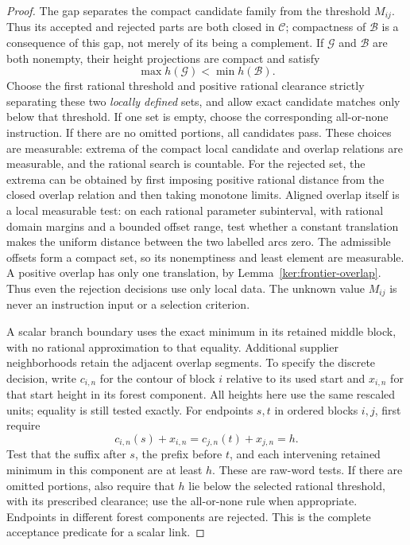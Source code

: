 \documentclass[11pt]{article}
\numberwithin{equation}{section}
\theoremstyle{definition}
\theoremstyle{remark}
\newcommand{\1}{\mathbf 1}
\begin{document}
\begin{proof}
The gap separates the compact candidate family from the threshold
\(M_{ij}\).  Thus its accepted and rejected parts are both closed
in \(\mathcal C\); compactness of \(\mathcal B\) is a consequence
of this gap, not merely of its being a complement.  If
\(\mathcal G\) and \(\mathcal B\) are both nonempty, their height
projections are compact and satisfy
\[
 \max h(\mathcal G)<\min h(\mathcal B).
\]
Choose the first rational threshold and positive rational clearance
strictly separating these two \emph{locally defined} sets, and allow
exact candidate matches only below that threshold.  If one set is
empty, choose the corresponding all-or-none instruction.  If there
are no omitted portions, all candidates pass.  These choices are
measurable: extrema of the compact local candidate and overlap
relations are measurable, and the rational search is countable.
For the rejected set, the extrema can be obtained by first imposing
positive rational distance from the closed overlap relation and then
taking monotone limits.  Aligned overlap itself is a local measurable
test: on each rational parameter subinterval, with rational domain
margins and a bounded offset range, test whether a constant translation
makes the uniform distance between the two labelled arcs zero.
The admissible offsets form a compact set, so its nonemptiness and
least element are measurable.  A positive overlap has only one
translation, by Lemma~\ref{ker:frontier-overlap}.  Thus even the rejection decisions use
only local data.  The unknown value \(M_{ij}\) is never an instruction
input or a selection criterion.

A scalar branch boundary uses the exact minimum in its retained
middle block, with no rational approximation to that equality.
Additional supplier neighborhoods retain the adjacent overlap
segments.  To specify the discrete decision, write $c_{i,n}$ for
the contour of block $i$ relative to its used start and $x_{i,n}$
for that start height in its forest component.  All heights here
use the same rescaled units; equality is still tested exactly.
For endpoints $s,t$ in ordered blocks $i,j$, first require
\[
 c_{i,n}(s)+x_{i,n}=c_{j,n}(t)+x_{j,n}=h.
\]
Test that the suffix after $s$, the prefix before $t$, and each
intervening retained minimum in this component are at least $h$.
These are raw-word tests.  If there are omitted portions, also
require that $h$ lie below the selected rational threshold, with
its prescribed clearance; use the all-or-none rule when appropriate.
Endpoints in different forest components are rejected.  This is
the complete acceptance predicate for a scalar link.


\end{proof}
\end{document}
